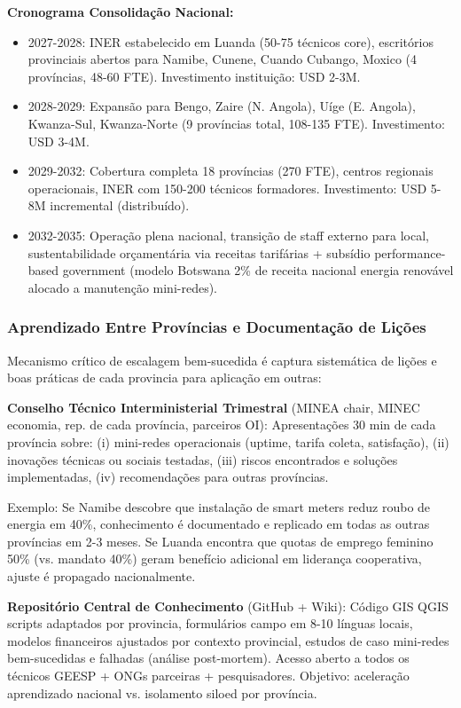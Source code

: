 \documentclass[12pt, a4paper]{article}
\begin{document}
{{{{{{{{{{{{\textbf{Cronograma Consolidação Nacional:}
\begin{itemize}
\item 2027-2028: INER estabelecido em Luanda (50-75 técnicos core), escritórios provinciais abertos para Namibe, Cunene, Cuando Cubango, Moxico (4 províncias, 48-60 FTE). Investimento instituição: USD 2-3M.

\item 2028-2029: Expansão para Bengo, Zaire (N. Angola), Uíge (E. Angola), Kwanza-Sul, Kwanza-Norte (9 províncias total, 108-135 FTE). Investimento: USD 3-4M.

\item 2029-2032: Cobertura completa 18 províncias (270 FTE), centros regionais operacionais, INER com 150-200 técnicos formadores. Investimento: USD 5-8M incremental (distribuído).

\item 2032-2035: Operação plena nacional, transição de staff externo para local, sustentabilidade orçamentária via receitas tarifárias + subsídio performance-based government (modelo Botswana 2\% de receita nacional energia renovável alocado a manutenção mini-redes).
\end{itemize}

\subsubsection{Aprendizado Entre Províncias e Documentação de Lições}

Mecanismo crítico de escalagem bem-sucedida é captura sistemática de lições e boas práticas de cada provincia para aplicação em outras:

\textbf{Conselho Técnico Interministerial Trimestral} (MINEA chair, MINEC economia, rep. de cada província, parceiros OI): Apresentações 30 min de cada província sobre: (i) mini-redes operacionais (uptime, tarifa coleta, satisfação), (ii) inovações técnicas ou sociais testadas, (iii) riscos encontrados e soluções implementadas, (iv) recomendações para outras províncias.

Exemplo: Se Namibe descobre que instalação de smart meters reduz roubo de energia em 40\%, conhecimento é documentado e replicado em todas as outras províncias em 2-3 meses. Se Luanda encontra que quotas de emprego feminino 50\% (vs. mandato 40\%) geram benefício adicional em liderança cooperativa, ajuste é propagado nacionalmente.

\textbf{Repositório Central de Conhecimento} (GitHub + Wiki): Código GIS QGIS scripts adaptados por provincia, formulários campo em 8-10 línguas locais, modelos financeiros ajustados por contexto provincial, estudos de caso mini-redes bem-sucedidas e falhadas (análise post-mortem). Acesso aberto a todos os técnicos GEESP + ONGs parceiras + pesquisadores. Objetivo: aceleração aprendizado nacional vs. isolamento siloed por província.

}}}}}}}}}}}}
\end{document}
